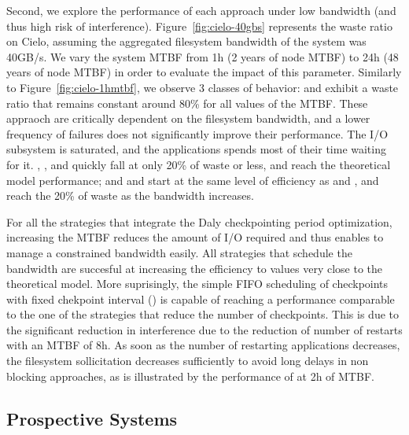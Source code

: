 Second, we explore the performance of each approach under low
bandwidth (and thus high risk of
interference). Figure~\ref{fig:cielo-40gbs} represents the waste ratio
on Cielo, assuming the aggregated filesystem bandwidth of the system
was 40GB/s. We vary the system MTBF from 1h (2 years of node MTBF) to
24h (48 years of node MTBF) in order to evaluate the impact of this
parameter. Similarly to Figure~\ref{fig:cielo-1hmtbf}, we observe 3
classes of behavior: \propfixed and \bfifofixed exhibit a waste ratio
that remains constant around 80\% for all values of the MTBF. These
appraoch are critically dependent on the filesystem bandwidth, and a
lower frequency of failures does not significantly improve their
performance. The I/O subsystem is saturated, and the applications
spends most of their time waiting for it. \fifodaly, \fifofixed, and
\cooperative quickly fall at only 20\% of waste or less, and reach
the theoretical model performance; and \propdaly and \bfifodaly start
at the same level of efficiency as \propfixed and \bfifofixed, and
reach the 20\% of waste as the bandwidth increases.

For all the strategies that integrate the Daly checkpointing period
optimization, increasing the MTBF reduces the amount of I/O required
and thus enables to manage a constrained bandwidth easily. All
strategies that schedule the bandwidth are succesful at increasing the
efficiency to values very close to the theoretical model. More
suprisingly, the simple FIFO scheduling of checkpoints with fixed
chekpoint interval (\bfifofixed) is capable of reaching a performance
comparable to the one of the strategies that reduce the number of
checkpoints. This is due to the significant reduction in interference
due to the reduction of number of restarts with an MTBF of 8h. As soon
as the number of restarting applications decreases, the filesystem
sollicitation decreases sufficiently to avoid long delays in non blocking
approaches, as is illustrated by the performance of \fifofixed at 2h
of MTBF.

\subsection{Prospective Systems}
